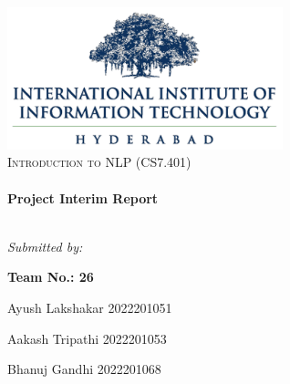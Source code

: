 \begin{titlepage}
    \centering

    \includegraphics[width=0.6\textwidth]{img/collegelogo.png}\\[4cm]
    
    \textsc{\LARGE Introduction to NLP (CS7.401)}\\[0.7cm]

    \noindent\makebox[\linewidth]{\rule{.7\paperwidth}{.6pt}}\\[0.7cm]
    { \huge \bfseries Project Interim Report}\\[0.25cm]
    \noindent\makebox[\linewidth]{\rule{.7\paperwidth}{.6pt}}\\[0.7cm]
    \vfill

    {\Large\itshape Submitted by:\par}
    {\LARGE \textbf{Team No.: 26}}
    
    {\Large Ayush Lakshakar    2022201051}
    
	{\Large Aakash Tripathi    2022201053}
	
	{\Large Bhanuj Gandhi    2022201068}

    \vfill
\end{titlepage}


